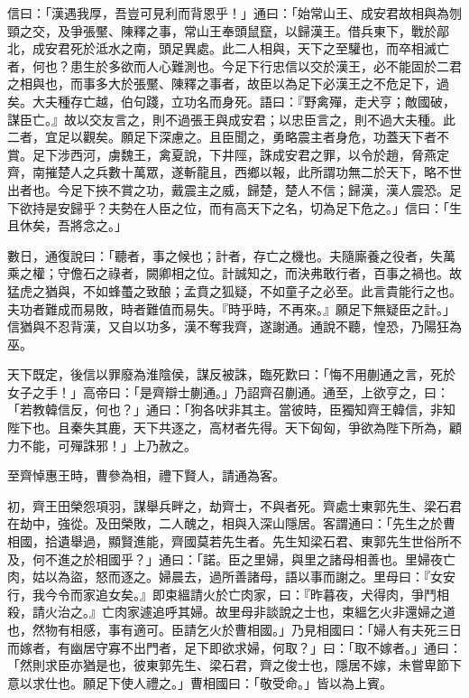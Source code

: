 \begin{pinyinscope}
信曰：「漢遇我厚，吾豈可見利而背恩乎！」通曰：「始常山王、成安君故相與為刎頸之交，及爭張黶、陳釋之事，常山王奉頭鼠竄，以歸漢王。借兵東下，戰於鄗北，成安君死於泜水之南，頭足異處。此二人相與，天下之至驩也，而卒相滅亡者，何也？患生於多欲而人心難測也。今足下行忠信以交於漢王，必不能固於二君之相與也，而事多大於張黶、陳釋之事者，故臣以為足下必漢王之不危足下，過矣。大夫種存亡越，伯句踐，立功名而身死。語曰：『野禽殫，走犬亨；敵國破，謀臣亡。』故以交友言之，則不過張王與成安君；以忠臣言之，則不過大夫種。此二者，宜足以觀矣。願足下深慮之。且臣聞之，勇略震主者身危，功蓋天下者不賞。足下涉西河，虜魏王，禽夏說，下井陘，誅成安君之罪，以令於趙，脅燕定齊，南摧楚人之兵數十萬眾，遂斬龍且，西鄉以報，此所謂功無二於天下，略不世出者也。今足下挾不賞之功，戴震主之威，歸楚，楚人不信；歸漢，漢人震恐。足下欲持是安歸乎？夫勢在人臣之位，而有高天下之名，切為足下危之。」信曰：「生且休矣，吾將念之。」

數日，通復說曰：「聽者，事之候也；計者，存亡之機也。夫隨廝養之役者，失萬乘之權；守儋石之祿者，闕卿相之位。計誠知之，而決弗敢行者，百事之禍也。故猛虎之猶與，不如蜂蠆之致酿；孟賁之狐疑，不如童子之必至。此言貴能行之也。夫功者難成而易敗，時者難值而易失。『時乎時，不再來。』願足下無疑臣之計。」信猶與不忍背漢，又自以功多，漢不奪我齊，遂謝通。通說不聽，惶恐，乃陽狂為巫。

天下既定，後信以罪廢為淮陰侯，謀反被誅，臨死歎曰：「悔不用蒯通之言，死於女子之手！」高帝曰：「是齊辯士蒯通。」乃詔齊召蒯通。通至，上欲亨之，曰：「若教韓信反，何也？」通曰：「狗各吠非其主。當彼時，臣獨知齊王韓信，非知陛下也。且秦失其鹿，天下共逐之，高材者先得。天下匈匈，爭欲為陛下所為，顧力不能，可殫誅邪！」上乃赦之。

至齊悼惠王時，曹參為相，禮下賢人，請通為客。

初，齊王田榮怨項羽，謀舉兵畔之，劫齊士，不與者死。齊處士東郭先生、梁石君在劫中，強從。及田榮敗，二人醜之，相與入深山隱居。客謂通曰：「先生之於曹相國，拾遺舉過，顯賢進能，齊國莫若先生者。先生知梁石君、東郭先生世俗所不及，何不進之於相國乎？」通曰：「諾。臣之里婦，與里之諸母相善也。里婦夜亡肉，姑以為盜，怒而逐之。婦晨去，過所善諸母，語以事而謝之。里母曰：『女安行，我今令而家追女矣。』即束縕請火於亡肉家，曰：『昨暮夜，犬得肉，爭鬥相殺，請火治之。』亡肉家遽追呼其婦。故里母非談說之士也，束縕乞火非還婦之道也，然物有相感，事有適可。臣請乞火於曹相國。」乃見相國曰：「婦人有夫死三日而嫁者，有幽居守寡不出門者，足下即欲求婦，何取？」曰：「取不嫁者。」通曰：「然則求臣亦猶是也，彼東郭先生、梁石君，齊之俊士也，隱居不嫁，未嘗卑節下意以求仕也。願足下使人禮之。」曹相國曰：「敬受命。」皆以為上賓。


\end{pinyinscope}
